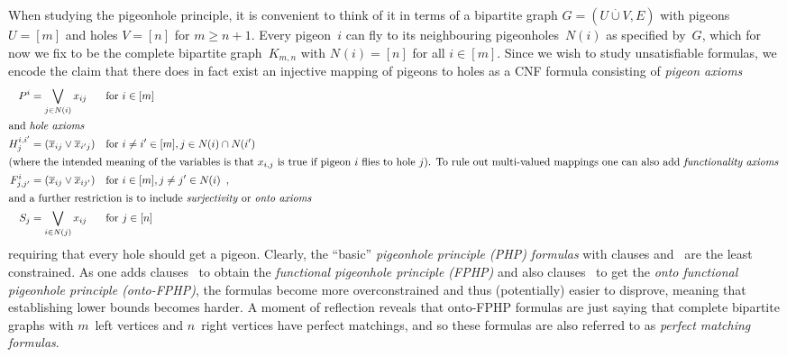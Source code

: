 \documentclass{theoretics}
\newcommand{\intersection}{\cap}
\newcommand{\disjointunion}{\overset{.}{\cup}}
\newcommand{\Lor}{\bigvee}
\newcommand{\olnot}[1]{\overline{#1}}
\newcommand{\introduceterm}[1]{{\emph{#1}}}
\newcommand{\eqcomma}{\enspace ,}
\newcommand{\pigeonclause}[1]{P^{#1}}
\newcommand{\holeclause}[3]{H^{#1,#2}_{#3}}
\newcommand{\functionclause}[3]{F^{#1}_{#2,#3}}
\newcommand{\ontoclause}[1]{S_{#1}}
\newcommand{\neigh}[2][]{N_{{#1}}(#2)}
\numberwithin{equation}{section}
\begin{document}
When studying the pigeonhole principle,
it is convenient to think of it in terms of a bipartite graph
$G = (U \disjointunion  V, E)$  with 
pigeons $U = [m]$ and holes $V = [n]$ for
$m \geq n+1$.
Every pigeon~$i$ can fly to its neighbouring pigeonholes~$N(i)$ as
specified 
by~$G$,
which for now we 
fix to be the 
complete bipartite graph~$K_{m,n}$ with $\neigh{i} = [n]$ for all $i \in [m]$.
Since we wish to study unsatisfiable formulas, 
we encode the claim that there does in fact exist an injective
mapping of pigeons to holes as a CNF formula consisting of
\introduceterm{pigeon axioms}
\begin{subequations}
\begin{align}
  \label{eq:axiom-pigeon}
  \pigeonclause{i}
  &= \Lor_{j \in 
    \neigh{i}
    } x_{ij} 
  &&\text{for } i \in [m]
  \\
\shortintertext{and \introduceterm{hole axioms}}
  \label{eq:axiom-hole}
  \holeclause{i}{i'}{j}
  &= (\olnot{x}_{ij} \vee \olnot{x}_{i'j}) 
  &&\text{for }i \neq i' \in [m], j \in \neigh{i} \intersection \neigh{i'} 
  \\
\intertext{(where the intended meaning of the variables is that
  $x_{i,j}$ is true if pigeon~$i$ flies to hole~$j$).
  To rule out multi-valued mappings one can also add
  \introduceterm{functionality axioms}
}
  \label{eq:axiom-functionality}
  \functionclause{i}{j}{j'}
    &= (\olnot{x}_{ij} \vee \olnot{x}_{ij'}) 
  &&\text{for }i \in [m], j \neq j' \in \neigh{i} \eqcomma\\
  \intertext{and a further restriction is to include
  \introduceterm{surjectivity} or
  \introduceterm{onto axioms}
}
  \label{eq:axiom-onto}
  \ontoclause{j}
  &= \Lor_{i \in 
    \neigh{j}
    } x_{ij} 
  &&\text{for } j \in [n] 
\end{align}
\end{subequations}
requiring that every hole should get a pigeon.
Clearly, the ``basic''
\introduceterm{pigeonhole principle (PHP) formulas}
with clauses
 and~
are the least constrained.
As one adds clauses~ to obtain
the
\introduceterm{functional pigeonhole principle (FPHP)}
and also clauses~ to get
the
\introduceterm{onto functional pigeonhole principle (onto-FPHP)},
the formulas become more overconstrained and thus (potentially) easier
to disprove, meaning that establishing lower bounds becomes harder.
A moment of reflection reveals that onto-FPHP formulas are just saying
that complete bipartite graphs with $m$~left vertices and
$n$~right vertices have perfect matchings, and so these formulas are
also referred to as
\introduceterm{perfect matching formulas}.
\end{document}
